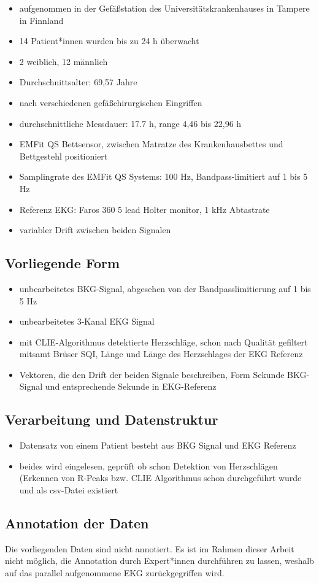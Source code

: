 	\begin{itemize}
		\item aufgenommen in der Gefäßstation des Universitätskrankenhauses in Tampere in Finnland
		\item 14 Patient*innen wurden bis zu 24 h überwacht
		\item 2 weiblich, 12 männlich
		\item Durchschnittsalter: 69,57 Jahre
		\item nach verschiedenen gefäßchirurgischen Eingriffen
		\item durchschnittliche Messdauer: 17.7 h, range 4,46 bis 22,96 h
		\item EMFit QS Bettsensor, zwischen Matratze des Krankenhausbettes und Bettgestehl positioniert
		\item Samplingrate des EMFit QS Systems: 100 Hz, Bandpass-limitiert auf 1 bis 5 Hz
		\item Referenz EKG: Faros 360 5 lead Holter monitor, 1 kHz Abtastrate
		\item variabler Drift zwischen beiden Signalen %
	\end{itemize}
	
	\subsection{Vorliegende Form}
	
	\begin{itemize}
		\item unbearbeitetes \ac{BKG}-Signal, abgesehen von der Bandpasslimitierung auf 1 bis 5 Hz
		\item unbearbeitetes 3-Kanal EKG Signal
		\item mit CLIE-Algorithmus detektierte Herzschläge, schon nach Qualität gefiltert mitsamt Brüser SQI, Länge und Länge des Herzschlages der EKG Referenz
		\item Vektoren, die den Drift der beiden Signale beschreiben, Form Sekunde \ac{BKG}-Signal und entsprechende Sekunde in \ac{EKG}-Referenz
	\end{itemize}
	
	\subsection{Verarbeitung und Datenstruktur}
	
	\begin{itemize}
		\item Datensatz von einem Patient besteht aus BKG Signal und EKG Referenz
		\item beides wird eingelesen, geprüft ob schon Detektion von Herzschlägen (Erkennen von R-Peaks bzw. CLIE Algorithmus schon durchgeführt wurde und als csv-Datei existiert
	\end{itemize}

	\subsection{Annotation der Daten}

Die vorliegenden Daten sind nicht annotiert. Es ist im Rahmen dieser Arbeit nicht möglich, die Annotation durch Expert*innen durchführen zu lassen, weshalb auf das parallel aufgenommene \ac{EKG} zurückgegriffen wird.
